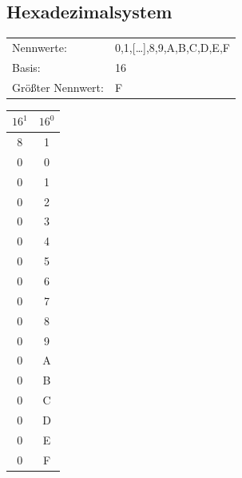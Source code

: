 \documentclass[12pt,a4paper]{article}
\begin{document}
    \begin{minipage}{.49\textwidth}
        \vspace{0.5cm}
        
        \subsection{Hexadezimalsystem}
            \begin{tabularx}{9cm}{XX}
                Nennwerte:&0,1,[\dots],8,9,A,B,C,D,E,F\\
                Basis:&16\\
                Größter Nennwert:&F\\
            \end{tabularx}
            \begin{center}
                \begin{tabular}{|c|c|}
                    \hline

                    $16^1$ & $16^0$ \\
                    \hline
                    8     & 1      \\
                    \hline
                    \hline
                    0      & 0      \\
                    0      & 1      \\
                    0      & 2      \\
                    0      & 3      \\
                    0      & 4      \\
                    0      & 5      \\
                    0      & 6      \\
                    0      & 7      \\
                    0      & 8      \\
                    0      & 9      \\
                    0      & A      \\
                    0      & B      \\
                    0      & C      \\
                    0      & D      \\
                    0      & E      \\
                    0      & F      \\
                    \hline
                \end{tabular}
            \end{center}
    \end{minipage}
\end{document}
